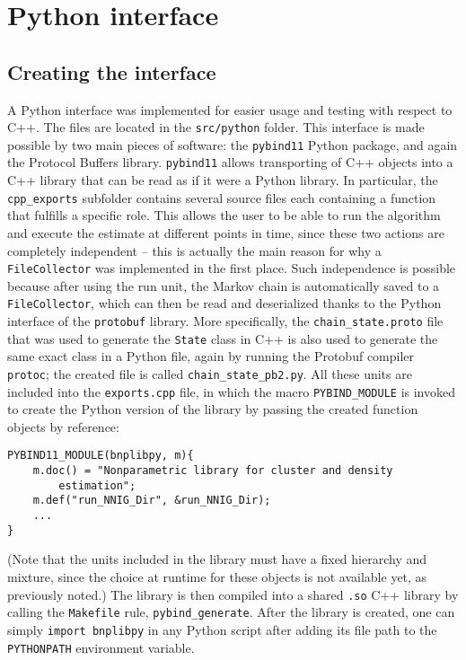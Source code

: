 \chapter{Python interface} \label{chap-py-int}

\section{Creating the interface}
A Python interface was implemented for easier usage and testing with respect to C++.
The files are located in the \verb|src/python| folder.
This interface is made possible by two main pieces of software: the \verb|pybind11| Python package, and again the Protocol Buffers library.
\verb|pybind11| allows transporting of C++ objects into a C++ library that can be read as if it were a Python library.
In particular, the \verb|cpp_exports| subfolder contains several source files each containing a function that fulfills a specific role.
This allows the user to be able to run the algorithm and execute the estimate at different points in time, since these two actions are completely independent -- this is actually the main reason for why a \verb|FileCollector| was implemented in the first place.
Such independence is possible because after using the run unit, the Markov chain is automatically saved to a \verb|FileCollector|, which can then be read and deserialized thanks to the Python interface of the \verb|protobuf| library.
More specifically, the \verb|chain_state.proto| file that was used to generate the \verb|State| class in C++ is also used to generate the same exact class in a Python file, again by running the Protobuf compiler \verb|protoc|; the created file is called \verb|chain_state_pb2.py|.
All these units are included into the \verb|exports.cpp| file, in which the macro \verb|PYBIND_MODULE| is invoked to create the Python version of the library by passing the created function objects by reference:
\begin{verbatim}
PYBIND11_MODULE(bnplibpy, m){
    m.doc() = "Nonparametric library for cluster and density
        estimation";
    m.def("run_NNIG_Dir", &run_NNIG_Dir);
    ...
}
\end{verbatim}
(Note that the units included in the library must have a fixed hierarchy and mixture, since the choice at runtime for these objects is not available yet, as previously noted.)
The library is then compiled into a shared \verb|.so| C++ library by calling the \verb|Makefile| rule, \verb|pybind_generate|.
After the library is created, one can simply \verb|import bnplibpy| in any Python script after adding its file path to the \verb|PYTHONPATH| environment variable.

